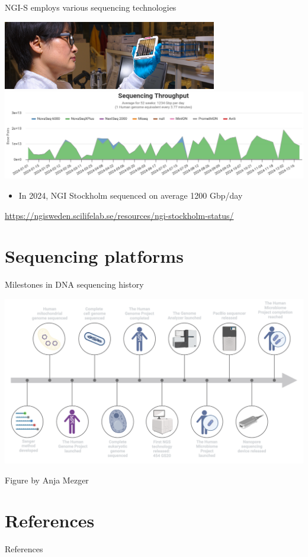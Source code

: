 \documentclass[10pt]{beamer}
\newcommand{\credit}[1]{{\vspace{\fill} \par \raggedleft \scriptsize \mdseries \color{mDarkBrown} #1 \par}}
\begin{document}
\begin{frame}{NGI-S employs various sequencing technologies}
	\begin{center}
		\includegraphics[width=0.7\textwidth]{./figures/ngi-choi-flowcell.jpg} \\
		\hspace*{-1cm}
		\includegraphics[width=1.2\textwidth]{./figures/ngis-throughput-2024.png}
	\end{center}
	\begin{itemize}
		\item In 2024, NGI Stockholm sequenced on average 1200 Gbp/day
	\end{itemize}
	\credit{\href{https://ngisweden.scilifelab.se/resources/ngi-stockholm-status/}{https://ngisweden.scilifelab.se/resources/ngi-stockholm-status/}}
\end{frame}


\section{Sequencing platforms}


\begin{frame}[standout]{Milestones in DNA sequencing history}
	\begin{center}
		\hspace*{-1.1cm}
		\includegraphics[width=1.2\textwidth]{./figures/timeline.png}
	\end{center}
	\credit{Figure by Anja Mezger}
\end{frame}

\section{References}
\begin{frame}[allowframebreaks]{References}
\begingroup
\renewcommand*{\bibfont}{\footnotesize} 
\printbibliography[heading=none]
\endgroup
\end{frame}
\end{document}
